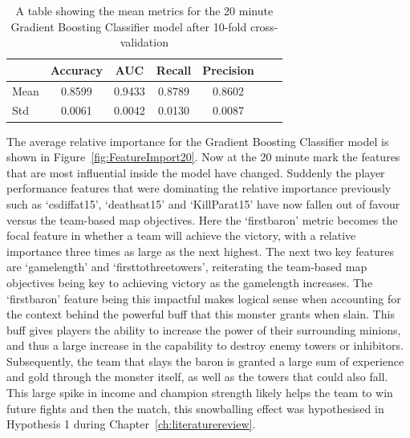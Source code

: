 \begin{table}[h]
    \centering
    \begin{tabular}{lcccccc}
        \toprule
        \textbf{} & \textbf{Accuracy} & \textbf{AUC} & \textbf{Recall} & \textbf{Precision} \\
        \midrule
        Mean & 0.8599 & 0.9433 & 0.8789 & 0.8602 \\
        Std & 0.0061 & 0.0042 & 0.0130 & 0.0087 \\
        \bottomrule
    \end{tabular}
    \caption{A table showing the mean metrics for the 20 minute Gradient Boosting Classifier model after 10-fold cross-validation}
    \label{tab:Kfold20}
\end{table}

The average relative importance for the Gradient Boosting Classifier model is shown in Figure~\ref{fig:FeatureImport20}.
Now at the 20 minute mark the features that are most influential inside the model have changed.
Suddenly the player performance features that were dominating the relative importance previously such as `csdiffat15', `deathsat15' and `KillParat15' have now fallen out of favour versus the team-based map objectives.
Here the `firstbaron' metric becomes the focal feature in whether a team will achieve the victory, with a relative importance three times as large as the next highest.
The next two key features are `gamelength' and `firsttothreetowers', reiterating the
team-based map objectives being key to achieving victory as the gamelength increases.
The `firstbaron' feature being this impactful makes logical sense when accounting for the context behind the powerful \gls{buff} that this monster grants when slain.
This \gls{buff} gives players the ability to increase the power of their surrounding \glspl{minion}, and thus a large increase in the capability to destroy enemy \glspl{tower} or \glspl{inhibitor}.
Subsequently, the team that slays the \gls{baron} is granted a large sum of experience and gold through the monster itself, as well as the towers that could also fall.
This large spike in income and champion strength likely  helps the team to win future fights and then the match, this snowballing effect was hypothesised in Hypothesis 1 during Chapter~\ref{ch:literaturereview}. \\

